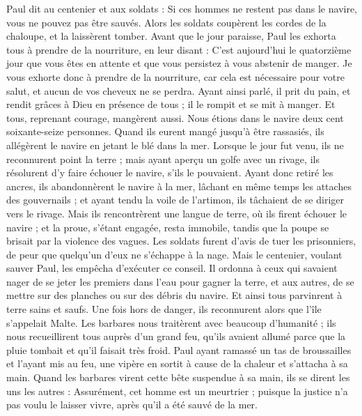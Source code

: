 \begin{multicols}{2}
Paul dit au centenier et aux soldats : Si ces hommes ne restent pas dans le navire, vous ne pouvez pas être sauvés.
Alors les soldats coupèrent les cordes de la chaloupe, et la laissèrent tomber.
Avant que le jour paraisse, Paul les exhorta tous à prendre de la nourriture, en leur disant : C’est aujourd'hui le quatorzième jour que vous êtes en attente et que vous persistez à vous abstenir de manger.
Je vous exhorte donc à prendre de la nourriture, car cela est nécessaire pour votre salut, et aucun de vos cheveux ne se perdra.
Ayant ainsi parlé, il prit du pain, et rendit grâces à Dieu en présence de tous ; il le rompit et se mit à manger.
Et tous, reprenant courage, mangèrent aussi.
Nous étions dans le navire deux cent soixante-seize personnes.
Quand ils eurent mangé jusqu'à être rassasiés, ils allégèrent le navire en jetant le blé dans la mer.
Lorsque le jour fut venu, ils ne reconnurent point la terre ; mais ayant aperçu un golfe avec un rivage, ils résolurent d'y faire échouer le navire, s’ils le pouvaient.
Ayant donc retiré les ancres, ils abandonnèrent le navire à la mer, lâchant en même temps les attaches des gouvernails ; et ayant tendu la voile de l'artimon, ils tâchaient de se diriger vers le rivage.
Mais ils rencontrèrent une langue de terre, où ils firent échouer le navire ; et la proue, s’étant engagée, resta immobile, tandis que la poupe se brisait par la violence des vagues.
Les soldats furent d’avis de tuer les prisonniers, de peur que quelqu’un d’eux ne s’échappe à la nage.
Mais le centenier, voulant sauver Paul, les empêcha d'exécuter ce conseil. Il ordonna à ceux qui savaient nager de se jeter les premiers dans l’eau pour gagner la terre,
et aux autres, de se mettre sur des planches ou sur des débris du navire. Et ainsi tous parvinrent à terre sains et saufs.
\VerseOne{}Une fois hors de danger, ils reconnurent alors que l'île s'appelait Malte.
Les barbares nous traitèrent avec beaucoup d’humanité ; ils nous recueillirent tous auprès d’un grand feu, qu’ils avaient allumé parce que la pluie tombait et qu’il faisait très froid.
Paul ayant ramassé un tas de broussailles et l’ayant mis au feu, une vipère en sortit à cause de la chaleur et s’attacha à sa main.
Quand les barbares virent cette bête suspendue à sa main, ils se dirent les uns les autres : Assurément, cet homme est un meurtrier ; puisque la justice n’a pas voulu le laisser vivre, après qu’il a été sauvé de la mer.

\end{multicols}
